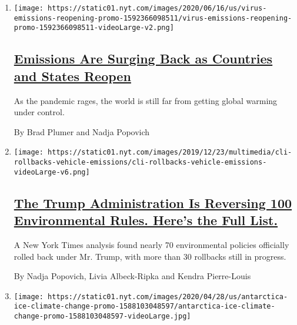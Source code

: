 \begin{enumerate}
\def\labelenumi{\arabic{enumi}.}
\item
  \texttt{[image: https://static01.nyt.com/images/2020/06/16/us/virus-emissions-reopening-promo-1592366098511/virus-emissions-reopening-promo-1592366098511-videoLarge-v2.png]}

  \hypertarget{emissions-are-surging-back-as-countries-and-states-reopen}{%
  \subsection{\texorpdfstring{\href{/interactive/2020/06/17/climate/virus-emissions-reopening.html}{Emissions
  Are Surging Back as Countries and States
  Reopen}}{Emissions Are Surging Back as Countries and States Reopen}}\label{emissions-are-surging-back-as-countries-and-states-reopen}}

  As the pandemic rages, the world is still far from getting global
  warming under control.

  By Brad Plumer and Nadja Popovich
\item
  \texttt{[image: https://static01.nyt.com/images/2019/12/23/multimedia/cli-rollbacks-vehicle-emissions/cli-rollbacks-vehicle-emissions-videoLarge-v6.png]}

  \hypertarget{the-trump-administration-is-reversing-100-environmental-rules-heres-the-full-list}{%
  \subsection{\texorpdfstring{\href{/interactive/2020/climate/trump-environment-rollbacks.html}{The
  Trump Administration Is Reversing 100 Environmental Rules. Here's the
  Full
  List.}}{The Trump Administration Is Reversing 100 Environmental Rules. Here's the Full List.}}\label{the-trump-administration-is-reversing-100-environmental-rules-heres-the-full-list}}

  A New York Times analysis found nearly 70 environmental policies
  officially rolled back under Mr. Trump, with more than 30 rollbacks
  still in progress.

  By Nadja Popovich, Livia Albeck-Ripka and Kendra Pierre-Louis
\item
  \texttt{[image: https://static01.nyt.com/images/2020/04/28/us/antarctica-ice-climate-change-promo-1588103048597/antarctica-ice-climate-change-promo-1588103048597-videoLarge.jpg]}

  \hypertarget{a-satellite-lets-scientists-see-antarcticas-melting-like-never-before}{%
}
\end{enumerate}
